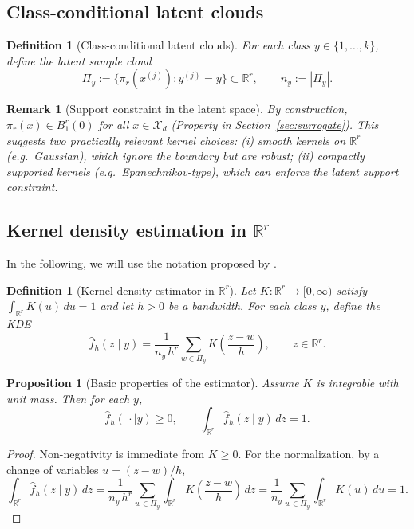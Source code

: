 \documentclass[preprint,11pt]{elsarticle}
\newtheorem{Definition}[Theorem]{Definition}
\newtheorem{Proposition}[Theorem]{Proposition}
\newtheorem{Remark}[Theorem]{Remark}
\newcommand{\R}{\mathbb{R}}
\begin{document}
\subsection{Class-conditional latent clouds}

\begin{Definition}[Class-conditional latent clouds]
\label{def:latent_clouds}
For each class $y\in\{1,\dots,k\}$, define the latent sample cloud
\[
\Pi_y:=\{\pi_r(x^{(j)}):y^{(j)}=y\}\subset \R^r,
\qquad
n_y := |\Pi_y|.
\]
\end{Definition}

\begin{Remark}[Support constraint in the latent space]
By construction, $\pi_r(x)\in B_1^r(0)$ for all $x\in\mathcal X_d$ (Property in Section~\ref{sec:surrogate}).
This suggests two practically relevant kernel choices:
(i) smooth kernels on $\R^r$ (e.g.\ Gaussian), which ignore the boundary but are robust;
(ii) compactly supported kernels (e.g.\ Epanechnikov-type), which can enforce the latent support constraint.
\end{Remark}

\subsection{Kernel density estimation in $\R^r$}

In the following, we will use the notation proposed by \cite{Scott2015}.

\begin{Definition}[Kernel density estimator in $\R^r$]
\label{def:kde_classconditional}
Let $K:\R^r\to[0,\infty)$ satisfy $\int_{\R^r}K(u)\,du=1$ and let $h>0$ be a bandwidth.
For each class $y$, define the KDE
\[
\widehat f_h(z\mid y)
=
\frac{1}{n_y\,h^r}
\sum_{w\in\Pi_y}
K\!\left(\frac{z-w}{h}\right),
\qquad z\in\R^r.
\]
\end{Definition}

\begin{Proposition}[Basic properties of the estimator]
\label{prop:kde_properties}
Assume $K$ is integrable with unit mass. Then for each $y$,
\[
\widehat f_h(\,\cdot\mid y)\ge 0,
\qquad
\int_{\R^r}\widehat f_h(z\mid y)\,dz = 1.
\]
\end{Proposition}

\begin{proof}
Non-negativity is immediate from $K\ge 0$.
For the normalization, by a change of variables $u=(z-w)/h$,
\[
\int_{\R^r}\widehat f_h(z\mid y)\,dz
=
\frac{1}{n_y\,h^r}\sum_{w\in\Pi_y}\int_{\R^r}K\!\left(\frac{z-w}{h}\right)\,dz
=
\frac{1}{n_y}\sum_{w\in\Pi_y}\int_{\R^r}K(u)\,du
=1.
\]
\end{proof}
\end{document}
